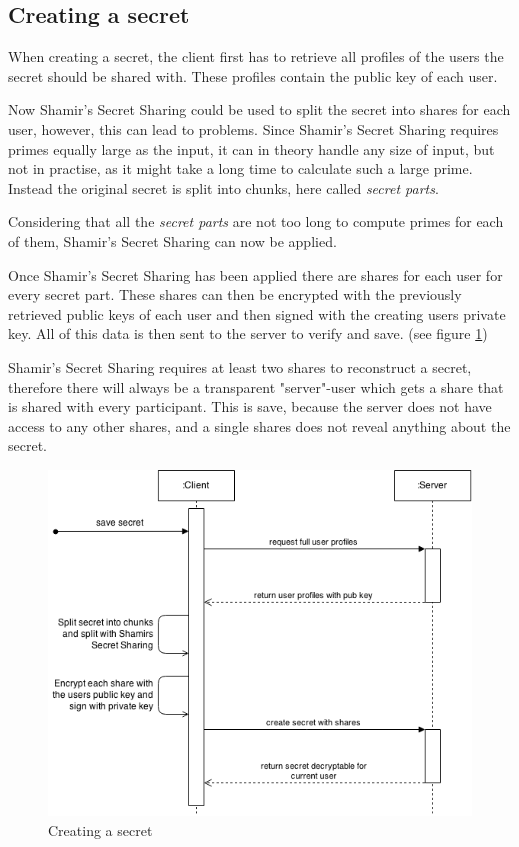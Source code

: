 \subsection{Creating a secret}

When creating a secret, the client first has to retrieve all profiles of the
users the secret should be shared with. These profiles contain the public key
of each user.

Now Shamir's Secret Sharing could be used to split the secret into shares for
each user, however, this can lead to problems. Since Shamir's Secret Sharing
requires primes equally large as the input, it can in theory handle any size of
input, but not in practise, as it might take a long time to calculate such a
large prime. Instead the original secret is split into chunks, here called
\textit{secret parts}.

Considering that all the \textit{secret parts} are not too long to compute
primes for each of them, Shamir's Secret Sharing can now be applied.

Once Shamir's Secret Sharing has been applied there are shares for each user
for every secret part. These shares can then be encrypted with the previously
retrieved public keys of each user and then signed with the creating users
private key. All of this data is then sent to the server to verify and save.
(see figure \ref{fig:creating_a_secret})

Shamir's Secret Sharing requires at least two shares to reconstruct a secret,
therefore there will always be a transparent "server"-user which gets a share
that is shared with every participant. This is save, because the server does
not have access to any other shares, and a single shares does not reveal
anything about the secret.

\begin{figure}
  \includegraphics[scale=0.55]{pictures/create_secret_sequence_diagram.png}
  \caption{Creating a secret}
  \label{fig:creating_a_secret}
\end{figure}

